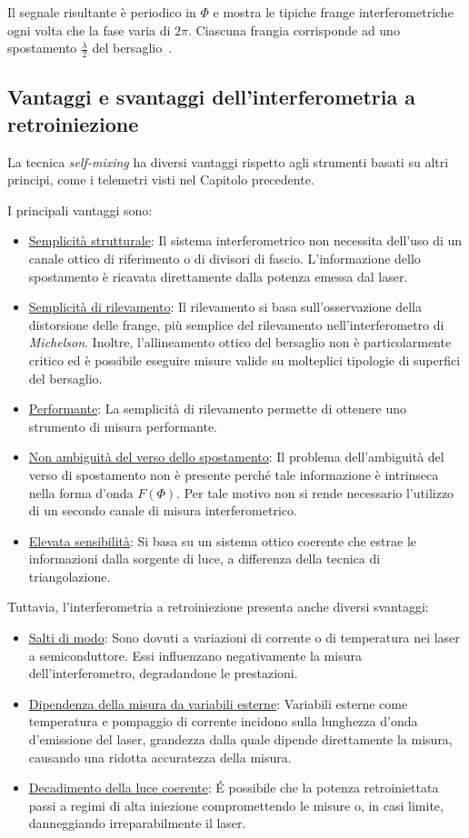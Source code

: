 Il segnale risultante è periodico in $\Phi$ e mostra le tipiche frange interferometriche ogni volta che la fase varia di $2\pi$. Ciascuna frangia corrisponde ad uno spostamento $\frac{\lambda}{2}$ del bersaglio~\cite{341714}.

\subsection{Vantaggi e svantaggi dell'interferometria a retroiniezione}
La tecnica \textit{self-mixing} ha diversi vantaggi rispetto agli strumenti basati su altri principi, come i telemetri visti nel Capitolo precedente.

I principali vantaggi sono:
\begin{itemize}
	\item \underline{Semplicità strutturale}: Il sistema interferometrico non necessita dell'uso di un canale ottico di riferimento o di divisori di fascio. L'informazione dello spostamento è ricavata direttamente dalla potenza emessa dal laser.
	\item \underline{Semplicità di rilevamento}: Il rilevamento si basa sull'osservazione della distorsione delle frange, più semplice del rilevamento nell'interferometro di \textit{Michelson}. Inoltre, l'allineamento ottico del bersaglio non è particolarmente critico ed è possibile eseguire misure valide su molteplici tipologie di superfici del bersaglio.
	\item \underline{Performante}: La semplicità di rilevamento permette di ottenere uno strumento di misura performante.
	\item \underline{Non ambiguità del verso dello spostamento}: Il problema dell'ambiguità del verso di spostamento non è presente perché tale informazione è intrinseca nella forma d'onda $F(\Phi)$. Per tale motivo non si rende necessario l'utilizzo di un secondo canale di misura interferometrico. 
	\item \underline{Elevata sensibilità}: Si basa su un sistema ottico coerente che estrae le informazioni dalla sorgente di luce, a differenza della tecnica di triangolazione.
\end{itemize}
Tuttavia, l'interferometria a retroiniezione presenta anche diversi svantaggi:
\begin{itemize}
	\item \underline{Salti di modo}: Sono dovuti a variazioni di corrente o di temperatura nei laser a semiconduttore. Essi influenzano negativamente la misura dell'interferometro, degradandone le prestazioni.
	\item \underline{Dipendenza della misura da variabili esterne}: Variabili esterne come temperatura e pompaggio di corrente incidono sulla lunghezza d'onda d'emissione del laser, grandezza dalla quale dipende direttamente la misura, causando una ridotta accuratezza della misura.
	\item \underline{Decadimento della luce coerente}: \'E possibile che la potenza retroiniettata passi a regimi di alta iniezione compromettendo le misure o, in casi limite, danneggiando irreparabilmente il laser. 
\end{itemize}

